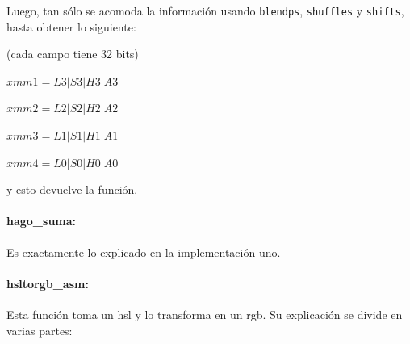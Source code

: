 \documentclass[a4paper]{article}
\begin{document}
Luego, tan sólo se acomoda la información usando {\tt blendps}, {\tt shuffles} y {\tt shifts}, hasta obtener lo siguiente:

 \vspace*{0.3cm}

(cada campo tiene 32 bits)	
	
\vspace*{0.3cm}	

$xmm1 = L3|S3|H3|A3$

\vspace*{0.3cm}

$xmm2 = L2|S2|H2|A2$

\vspace*{0.3cm}

$xmm3 = L1|S1|H1|A1$

\vspace*{0.3cm}

$xmm4 = L0|S0|H0|A0$

\vspace*{0.3cm}

y esto devuelve la función.

\paragraph{hago_suma:}

Es exactamente lo explicado en la implementación uno.


\paragraph*{hsltorgb_asm:}

Esta función toma un hsl y lo transforma en un rgb. Su explicación se divide en varias partes:
\end{document}

